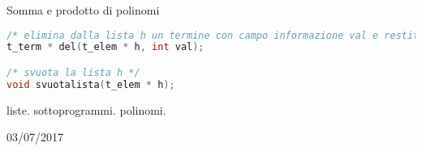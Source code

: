 \begin{exrev}{Somma e prodotto di polinomi}
\begin{lstlisting}[language=c]
/* elimina dalla lista h un termine con campo informazione val e restituisce la testa della lista */
t_term * del(t_elem * h, int val);

/* svuota la lista h */
void svuotalista(t_elem * h);
\end{lstlisting}

\begin{tags}
liste. sottoprogrammi. polinomi.
\end{tags}

\begin{esame}
03/07/2017
\end{esame}


\end{exrev}


